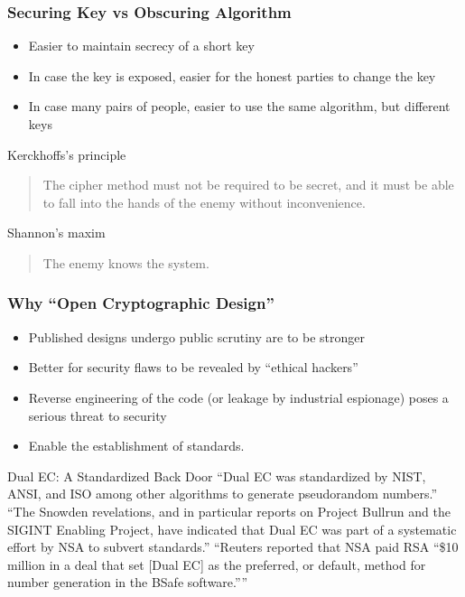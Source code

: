 \begin{frame}\frametitle{Securing Key vs Obscuring Algorithm}
\begin{itemize}
\item Easier to maintain secrecy of a short key
\item In case the key is exposed, easier for the honest parties to change the key
\item In case many pairs of people, easier to use the same algorithm, but different keys
\end{itemize}
\begin{alertblock}{Kerckhoffs's principle}
\begin{quote}
The cipher method must not be required to be secret, and it must be able to fall into the hands of the enemy without inconvenience.
\end{quote}	
\end{alertblock}
\begin{alertblock}{Shannon's maxim}
	\begin{quote}
		The enemy knows the system.
	\end{quote}	
\end{alertblock}
\end{frame}
\begin{frame}\frametitle{Why ``Open Cryptographic Design''}
\begin{itemize}
\item Published designs undergo public scrutiny are to be stronger
\item Better for security flaws to be revealed by ``ethical hackers''
\item Reverse engineering of the code (or leakage by industrial espionage) poses a serious threat to security
\item Enable the establishment of standards.
\end{itemize}
\begin{exampleblock}{Dual EC: A Standardized Back Door}
	``Dual EC was standardized by NIST, ANSI, and ISO among other algorithms to generate pseudorandom numbers.'' ``The Snowden revelations, and in particular reports on Project Bullrun and the SIGINT Enabling Project, have indicated that Dual EC was part of a systematic effort by NSA to subvert standards.'' ``Reuters reported that NSA paid RSA ``\$10 million in a deal that set [Dual EC] as the preferred, or default, method for number generation in the BSafe software.''''	
\end{exampleblock}
\end{frame}
